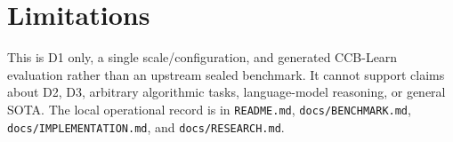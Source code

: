 \documentclass[11pt]{article}
\begin{document}
\section{Limitations}
This is D1 only, a single scale/configuration, and generated CCB-Learn
evaluation rather than an upstream sealed benchmark. It cannot support claims
about D2, D3, arbitrary algorithmic tasks, language-model reasoning, or
general SOTA. The local operational record is in \texttt{README.md},
\texttt{docs/BENCHMARK.md}, \texttt{docs/IMPLEMENTATION.md}, and
\texttt{docs/RESEARCH.md}.
\end{document}
